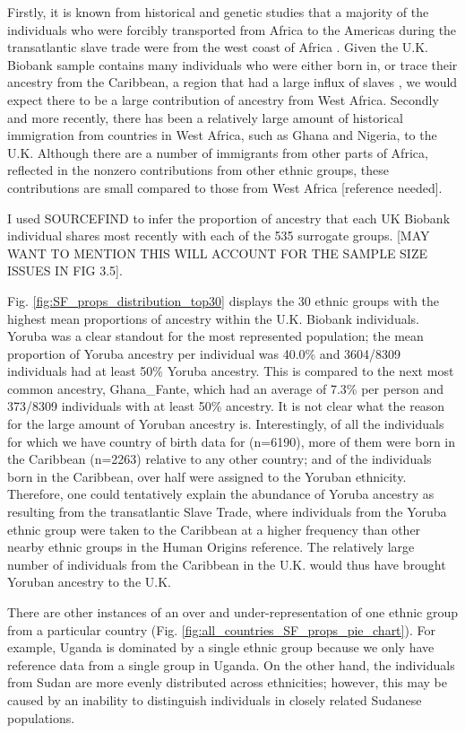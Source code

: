 Firstly, it is known from historical and genetic studies that a majority of the individuals who were forcibly transported from Africa to the Americas during the transatlantic slave trade were from the west coast of Africa \cite{micheletti2020genetic}. Given the U.K. Biobank sample contains many individuals who were either born in, or trace their ancestry from the Caribbean, a region that had a large influx of slaves \cite{rawley2005transatlantic}, we would expect there to be a large contribution of ancestry from West Africa. Secondly and more recently, there has been a relatively large amount of historical immigration from countries in West Africa, such as Ghana and Nigeria, to the U.K. Although there are a number of immigrants from other parts of Africa, reflected in the nonzero contributions from other ethnic groups, these contributions are small compared to those from West Africa [reference needed].

I used SOURCEFIND to infer the proportion of ancestry that each UK Biobank individual shares most recently with each of the 535 surrogate groups. [MAY WANT TO MENTION THIS WILL ACCOUNT FOR THE SAMPLE SIZE ISSUES IN FIG 3.5].

Fig. \ref{fig:SF_props_distribution_top30} displays the 30 ethnic groups with the highest mean proportions of ancestry within the U.K. Biobank individuals. Yoruba was a clear standout for the most represented population; the mean proportion of Yoruba ancestry per individual was 40.0\% and 3604/8309 individuals had at least 50\% Yoruba ancestry. This is compared to the next most common ancestry, Ghana\_Fante, which had an average of 7.3\% per person and 373/8309 individuals with at least 50\% ancestry. It is not clear what the reason for the large amount of Yoruban ancestry is. Interestingly, of all the individuals for which we have country of birth data for (n=6190), more of them were born in the Caribbean (n=2263) relative to any other country; and of the individuals born in the Caribbean, over half were assigned to the Yoruban ethnicity. Therefore, one could tentatively explain the abundance of Yoruba ancestry as resulting from the transatlantic Slave Trade, where individuals from the Yoruba ethnic group were taken to the Caribbean at a higher frequency than other nearby ethnic groups in the Human Origins reference. The relatively large number of individuals from the Caribbean in the U.K. would thus have brought Yoruban ancestry to the U.K. 

There are other instances of an over and under-representation of one ethnic group from a particular country (Fig. \ref{fig:all_countries_SF_props_pie_chart}). For example, Uganda is dominated by a single ethnic group because we only have reference data from a single group in Uganda. On the other hand, the individuals from Sudan are more evenly distributed across ethnicities; however, this may be caused by an inability to distinguish individuals in closely related Sudanese populations. 

